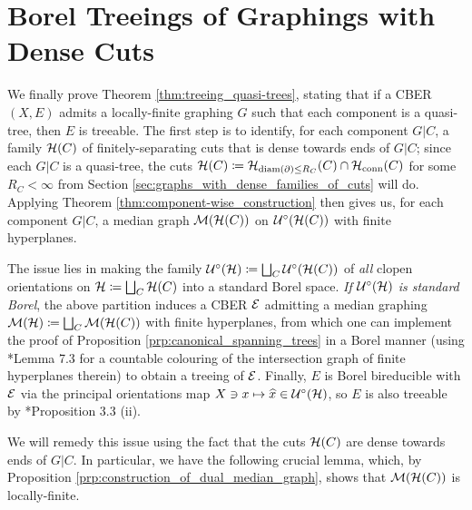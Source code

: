 \documentclass[reqno]{amsart}
\begin{document}
    \section{Borel Treeings of Graphings with Dense Cuts}\label{sec:borel_treeings_of_graphings_with_dense_cuts}

    We finally prove Theorem \ref{thm:treeing_quasi-trees}, stating that if a CBER $(X,E)$ admits a locally-finite graphing $G$ such that each component is a quasi-tree, then $E$ is treeable. The first step is to identify, for each component $G|C$, a family $\mathcal{H}(C)$ of finitely-separating cuts that is dense towards ends of $G|C$; since each $G|C$ is a quasi-tree, the cuts $\mathcal{H}(C)\coloneqq\mathcal{H}_{\operatorname{diam}(\partial)\leq R_C}(C)\cap\mathcal{H}_\mathrm{conn}(C)$ for some $R_C<\infty$ from Section \ref{sec:graphs_with_dense_families_of_cuts} will do. Applying Theorem \ref{thm:component-wise_construction} then gives us, for each component $G|C$, a median graph $\mathcal{M}(\mathcal{H}(C))$ on $\mathcal{U}^\circ(\mathcal{H}(C))$ with finite hyperplanes.

    The issue lies in making the family $\mathcal{U}^\circ(\mathcal{H})\coloneqq\bigsqcup_C\mathcal{U}^\circ(\mathcal{H}(C))$ of \textit{all} clopen orientations on $\mathcal{H}\coloneqq\bigsqcup_C\mathcal{H}(C)$ into a standard Borel space. \textit{If $\mathcal{U}^\circ(\mathcal{H})$ is standard Borel}, the above partition induces a CBER $\mathcal{E}$ admitting a median graphing $\mathcal{M}(\mathcal{H})\coloneqq\bigsqcup_C\mathcal{M}(\mathcal{H}(C))$ with finite hyperplanes, from which one can implement the proof of Proposition \ref{prp:canonical_spanning_trees} in a Borel manner (using \cite{KM04}*{Lemma 7.3} for a countable colouring of the intersection graph of finite hyperplanes therein) to obtain a treeing of $\mathcal{E}$. Finally, $E$ is Borel bireducible with $\mathcal{E}$ via the principal orientations map $X\ni x\mapsto\widehat{x}\in\mathcal{U}^\circ(\mathcal{H})$, so $E$ is also treeable by \cite{JKL02}*{Proposition 3.3 (ii)}.

    We will remedy this issue using the fact that the cuts $\mathcal{H}(C)$ are dense towards ends of $G|C$. In particular, we have the following crucial lemma, which, by Proposition \ref{prp:construction_of_dual_median_graph}, shows that $\mathcal{M}(\mathcal{H}(C))$ is locally-finite.
\end{document}
